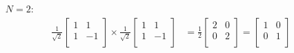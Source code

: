 \documentclass[11pt]{article}
\begin{document}
\begin{itemize}
	\item[$N = 2$:] 
	\begin{align*}
	\frac{1}{\sqrt{2}}
	\begin{bmatrix}
		1 & 1 \\
		1 & -1 \\
	\end{bmatrix}
	\times
	\frac{1}{\sqrt{2}}
	\begin{bmatrix}
		1 & 1 \\
		1 & -1 \\
	\end{bmatrix} &= 
	\frac{1}{2}
	\begin{bmatrix}
		2 & 0 \\
		0 & 2 \\
	\end{bmatrix} = 
	\begin{bmatrix}
		1 & 0 \\
		0 & 1 \\
	\end{bmatrix}
	\end{align*}


\end{itemize}
\end{document}
